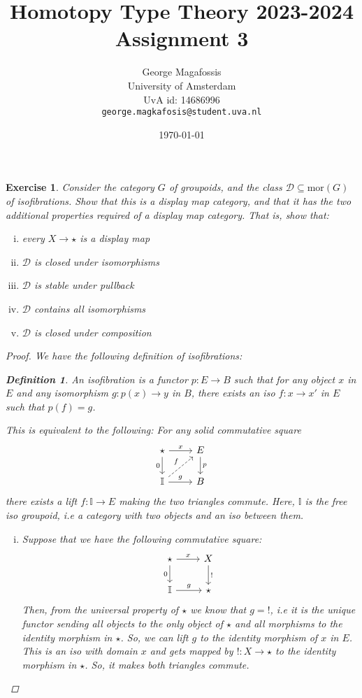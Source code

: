 \documentclass[10pt]{article}
\title{Homotopy Type Theory 2023-2024\\
       Assignment 3
      }
\date{\today}
\author{George Magafossis \\
University of Amsterdam \\
UvA id: 14686996 \\
\texttt{george.magkafosis@student.uva.nl}}
\newtheorem{exercise}{Exercise}
\theoremstyle{definition}
\newtheorem*{definition*}{Definition}
\newcommand{\mor}{\text{mor}}
\newcommand{\D}{\mathcal{D}}
\newcommand{\I}{\mathbb{I}}
\begin{document}
\maketitle

\begin{exercise}
Consider the category $G$ of groupoids, and the class
$\D \subseteq \mor(G)$ of isofibrations.
Show that this is a display map category, and that it
has the two additional properties required of a display
map category. That is, show that:
\begin{enumerate}[i)]
 \item every $X \to \star$ is a display map
 \item $\D$ is closed under isomorphisms
 \item $\D$ is stable under pullback
 \item $\D$ contains all isomorphisms
 \item $\D$ is closed under composition
\end{enumerate}

\begin{proof}
We have the following definition of isofibrations:
\begin{definition*}
An isofibration is a functor $p : E \to B$
such that for any object $x$ in $E$ and any
isomorphism $g : p(x) \to y$ in $B$, there exists
an iso $f : x \to x'$ in $E$ such that $p(f) = g$.
\end{definition*}
This is equivalent to the following: For any
solid commutative square
\[
 \begin{tikzcd}
  \star \dar["0"'] \rar["x"] & E \dar["p"] \\
  \I \rar["g"] \ar[ur, dashed, "f"] & B
 \end{tikzcd}
\]
there exists a lift $f : \I \to E$ making
the two triangles commute. Here, $\I$ is
the free iso groupoid, i.e a category with
two objects and an iso between them.

\begin{enumerate}[i)]
 \item Suppose that we have the following
 commutative square:
 \[
  \begin{tikzcd}
   \star \dar["0"'] \rar["x"] & X \dar["!"] \\
   \I \rar["g"] & \star
  \end{tikzcd}
 \]
 Then, from the universal property of $\star$
 we know that $g = !$, i.e it is the unique
 functor sending all objects to the only object
 of $\star$ and all morphisms to the identity
 morphism in $\star$. So, we can lift $g$ to
 the identity morphism of $x$ in $E$.
 This is an iso with domain $x$ and gets
 mapped by $! : X \to \star$ to the identity
 morphism in $\star$. So, it makes both triangles
 commute.
 

\end{enumerate}
\end{proof}
\end{exercise}
\end{document}
